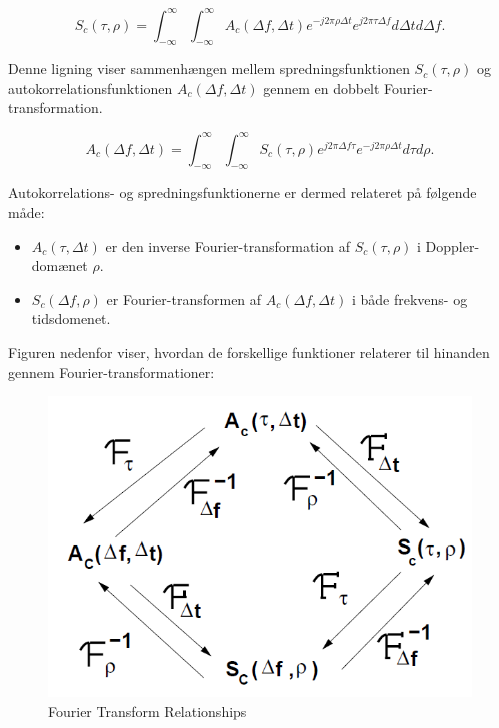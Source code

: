 \documentclass[a4paper,12pt]{book}
\begin{document}
	\[
	S_c(\tau, \rho) = \int_{-\infty}^{\infty} \int_{-\infty}^{\infty} A_c(\Delta f, \Delta t) e^{-j 2 \pi \rho \Delta t} e^{j 2 \pi \tau \Delta f} d\Delta t d\Delta f.
	\]
	
	Denne ligning viser sammenhængen mellem spredningsfunktionen \( S_c(\tau, \rho) \) og autokorrelationsfunktionen \( A_c(\Delta f, \Delta t) \) gennem en dobbelt Fourier-transformation.
	
	\[
	A_c(\Delta f, \Delta t) = \int_{-\infty}^{\infty} \int_{-\infty}^{\infty} S_c(\tau, \rho) e^{j 2 \pi \Delta f \tau} e^{-j 2 \pi \rho \Delta t} d\tau d\rho.
	\]
	
	Autokorrelations- og spredningsfunktionerne er dermed relateret på følgende måde:
	
	\begin{itemize}
		\item \( A_c(\tau, \Delta t) \) er den inverse Fourier-transformation af \( S_c(\tau, \rho) \) i Doppler-domænet \( \rho \).
	
		\item \( S_c(\Delta f, \rho) \) er Fourier-transformen af \( A_c(\Delta f, \Delta t) \) i både frekvens- og tidsdomenet.
	\end{itemize}
	
	Figuren nedenfor viser, hvordan de forskellige funktioner relaterer til hinanden gennem Fourier-transformationer:
	
	\begin{figure}[!h]
		\centering\includegraphics[width=\textwidth]{fig/fig29.png}
		\caption{Fourier Transform Relationships}
	\end{figure}
	
\end{document}

